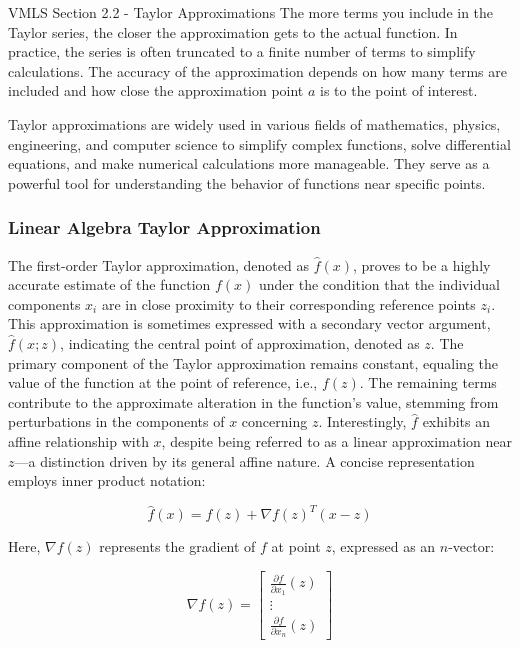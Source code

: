 \begin{notes}{VMLS Section 2.2 - Taylor Approximations}
    The more terms you include in the Taylor series, the closer the approximation gets to the actual function. In practice, the series is often truncated to a finite number of terms to simplify calculations. The accuracy of the 
    approximation depends on how many terms are included and how close the approximation point \(a\) is to the point of interest.
    
    Taylor approximations are widely used in various fields of mathematics, physics, engineering, and computer science to simplify complex functions, solve differential equations, and make numerical calculations more manageable. They 
    serve as a powerful tool for understanding the behavior of functions near specific points.

    \subsubsection*{Linear Algebra Taylor Approximation}

    The first-order Taylor approximation, denoted as $\hat{f}(x)$, proves to be a highly accurate estimate of the function $f(x)$ under the condition that the individual components $x_i$ are in close proximity to their corresponding reference 
    points $z_i$. This approximation is sometimes expressed with a secondary vector argument, $\hat{f}(x; z)$, indicating the central point of approximation, denoted as $z$. The primary component of the Taylor approximation remains constant, 
    equaling the value of the function at the point of reference, i.e., $f(z)$. The remaining terms contribute to the approximate alteration in the function's value, stemming from perturbations in the components of $x$ concerning $z$. Interestingly, 
    $\hat{f}$ exhibits an affine relationship with $x$, despite being referred to as a linear approximation near $z$—a distinction driven by its general affine nature. A concise representation employs inner product notation:

    \[
    \hat{f}(x) = f(z) + \nabla f(z)^T (x - z)
    \]
    
    Here, $\nabla f(z)$ represents the gradient of $f$ at point $z$, expressed as an $n$-vector:
    
    \[
    \nabla f(z) = \begin{bmatrix}
        \frac{\partial f}{\partial x_1}(z) \\
        \vdots \\
        \frac{\partial f}{\partial x_n}(z)
    \end{bmatrix}
    \]
    

\end{notes}
